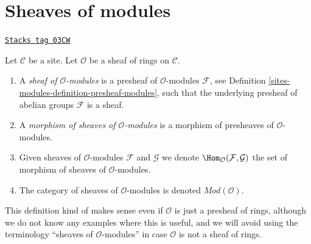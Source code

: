 \section{Sheaves of modules}
\label{sites-modules-section-sheaves-modules}
\begin{definition}
\label{sites-modules-definition-sheaf-modules}
\href{https://stacks.math.columbia.edu/tag/03CW}{\texttt{Stacks tag 03CW}}

Let $\mathcal{C}$ be a site.
Let $\mathcal{O}$ be a sheaf of rings on $\mathcal{C}$.
\begin{enumerate}
\item A {\it sheaf of $\mathcal{O}$-modules} is a presheaf
of $\mathcal{O}$-modules $\mathcal{F}$,
see Definition \ref{sites-modules-definition-presheaf-modules},
such that the underlying presheaf of abelian groups $\mathcal{F}$
is a sheaf.
\item A {\it morphism of sheaves of $\mathcal{O}$-modules}
is a morphism of presheaves of $\mathcal{O}$-modules.
\item Given sheaves of $\mathcal{O}$-modules
$\mathcal{F}$ and $\mathcal{G}$ we denote
$\Hom_\mathcal{O}(\mathcal{F}, \mathcal{G})$
the set of morphism of sheaves of $\mathcal{O}$-modules.
\item The category of sheaves of $\mathcal{O}$-modules
is denoted $\textit{Mod}(\mathcal{O})$.
\end{enumerate}
\end{definition}

This definition kind of makes sense even if $\mathcal{O}$ is just a
presheaf of rings, although we do not know any examples where
this is useful, and we will avoid using the terminology
``sheaves of $\mathcal{O}$-modules''
in case $\mathcal{O}$ is not a sheaf of rings.

